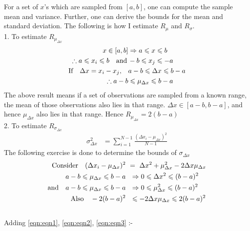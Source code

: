 \documentclass[a4paper,12pt]{article}
\begin{document}
\begin{itemize}
 For a set of $x$'s which are sampled from $[a,b]$, one can compute the sample mean and variance. Further, one can derive the bounds for the mean and standard deviation. The following is how I estimate $R_{\mu}$ and $R_{\sigma}$.\\
 
 1. To estimate $R_{\mu_{\Delta x}}$
 \begin{align}
  x \in [a,b] & \Rightarrow  a \leqslant x \leqslant b \notag\\  
  \therefore a \leqslant x_i \leqslant b  \quad \textrm{and} \, & -b \leqslant x_j \leqslant -a  \notag\\
  \textrm{If} \quad \Delta x = x_i - x_j, \quad & a-b \leqslant \Delta x \leqslant b-a \notag\\
    \therefore a-b & \leqslant \mu_{\Delta x} \leqslant b-a \label{eqn:range_mu}
 \end{align}
 The above result means if a set of observations are sampled from a known range, the mean of those observations also lies in that range. $\Delta x \in [a-b,b-a]$, and hence $\mu_{\Delta x}$ also lies in that range. Hence $R_{\mu_{\Delta x}} = 2(b-a)$\\

 2. To estimate $R_{\sigma_{\Delta x}}$
 \begin{align*}
  \sigma_{\Delta x}^2 &= \sum_{i=1}^{N-1}\frac{(\Delta x_i - \mu_{\Delta x})^2}{N-1}
 \end{align*}
 The following exercise is done to determine the bounds of $\sigma_{\Delta x}$
 \begin{align}
  \textrm{Consider} \quad (\Delta x_i - \mu_{\Delta x})^2 \,\,  & = \,\, \Delta x^2 + \mu_{\Delta x}^2 - 2\Delta x \mu_{\Delta x} \notag\\
  a-b \leqslant \mu_{\Delta x} \leqslant b-a \,\, & \,\, \Rightarrow  0 \leqslant \Delta x^2 \leqslant (b-a)^2 \label{eqn:eqn1} \\
  \textrm{and} \quad a-b \leqslant \mu_{\Delta x} \leqslant b-a \,\, & \,\, \Rightarrow 0 \leqslant \mu_{\Delta x}^2 \leqslant (b-a)^2 \label{eqn:eqn2} \\
  \textrm{Also} \quad -2 (b-a)^2 \,\, & \,\, \leqslant -2\Delta x \mu_{\Delta x} \leqslant 2 (b-a)^2 \label{eqn:eqn3} \\\notag
 \end{align}
 Adding \eqref{eqn:eqn1}, \eqref{eqn:eqn2}, \eqref{eqn:eqn3} :-


\end{itemize}
\end{document}
